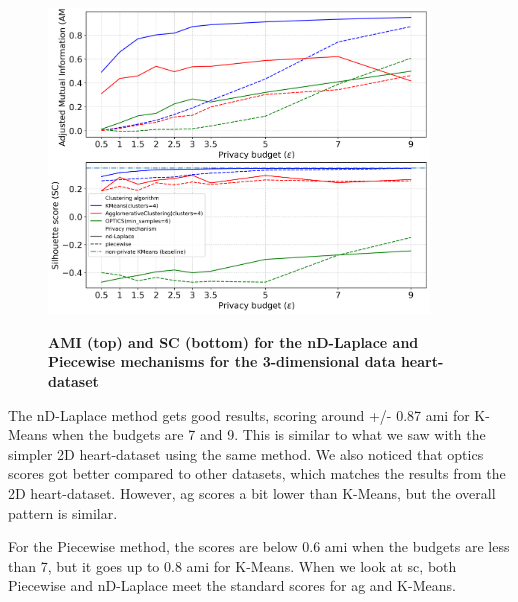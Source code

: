 \newpage
\begin{figure}[H]
  \centering

  \caption{\textbf{AMI (top) and SC (bottom) for the nD-Laplace and Piecewise mechanisms for the 3-dimensional data heart-dataset}}
  \includegraphics[width=0.9\textwidth]{Results/nd-laplace/nd-Laplace/heart-dataset/ami-and-sc_3_dimensions.png}
  \label{fig:validation-heart-dataset_comparison_3d-laplace}
\end{figure}
The nD-Laplace method gets good results, scoring around +/- 0.87 \gls{ami} for K-Means when the budgets are 7 and 9. This is similar to what we saw with the simpler 2D heart-dataset using the same method. We also noticed that \gls{optics} scores got better compared to other datasets, which matches the results from the 2D heart-dataset. However, \gls{ag} scores a bit lower than K-Means, but the overall pattern is similar.

For the Piecewise method, the scores are below 0.6 \gls{ami} when the budgets are less than 7, but it goes up to 0.8 \gls{ami} for K-Means. When we look at \gls{sc}, both Piecewise and nD-Laplace meet the standard scores for \gls{ag} and K-Means.

